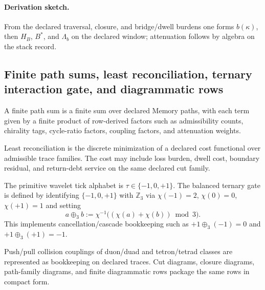 \paragraph{Derivation sketch.} From the declared traversal, closure, and bridge/dwell burdens one forms $b(\kappa)$, then $H_B$, $B^*$, and $\Lambda_b$ on the declared window; attenuation follows by algebra on the stack record.

\subsection{Finite path sums, least reconciliation, ternary interaction gate, and diagrammatic rows}\label{subsec:pathsum-diagram-operators}
\begin{definition}
\label{def:path-sum}
A finite path sum is a finite sum over declared Memory paths, with each term given by a finite product of row-derived factors such as admissibility counts, chirality tags, cycle-ratio factors, coupling factors, and attenuation weights.
\end{definition}

\begin{definition}
\label{def:least-reconciliation}
Least reconciliation is the discrete minimization of a declared cost functional over admissible trace families. The cost may include loss burden, dwell cost, boundary residual, and return-debt service on the same declared cut family.
\end{definition}

\begin{definition}
\label{def:ternary-gate}
The primitive wavelet tick alphabet is $\tau\in\{-1,0,+1\}$. The balanced ternary gate is defined by identifying $\{-1,0,+1\}$ with $\mathbb Z_3$ via $\chi(-1)=2$, $\chi(0)=0$, $\chi(+1)=1$ and setting
\[
a\oplus_3 b:=\chi^{-1}\!\bigl((\chi(a)+\chi(b))\bmod 3\bigr).
\]
This implements cancellation/cascade bookkeeping such as $+1\oplus_3(-1)=0$ and $+1\oplus_3(+1)=-1$.
\end{definition}

\begin{definition}
\label{def:collision-diagram}
Push/pull collision couplings of duon/duad and tetron/tetrad classes are represented as bookkeeping on declared traces. Cut diagrams, closure diagrams, path-family diagrams, and finite diagrammatic rows package the same rows in compact form.
\end{definition}

